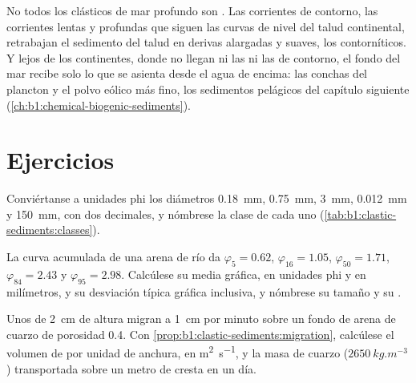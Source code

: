 No todos los clásticos de mar profundo son . Las corrientes de contorno, las corrientes lentas y profundas que siguen las curvas de nivel del talud continental, retrabajan
el sedimento del talud en derivas alargadas y suaves, los contorníticos. Y lejos de los continentes, donde no llegan ni las  ni las de contorno, el fondo del mar
recibe solo lo que se asienta desde el agua de encima: las conchas del plancton y el polvo eólico más fino, los sedimentos pelágicos del capítulo siguiente
(\cref{ch:b1:chemical-biogenic-sediments}).

\section{Ejercicios}

\begin{exercise}[$\star$]\label{exo:b1:clastic-sediments:1}
Conviértanse a unidades phi los diámetros \qty{0.18}{mm}, \qty{0.75}{mm}, \qty{3}{mm}, \qty{0.012}{mm} y \qty{150}{mm}, con dos decimales, y nómbrese la clase de cada uno
(\cref{tab:b1:clastic-sediments:classes}).
\end{exercise}

\begin{exercise}[$\star$]\label{exo:b1:clastic-sediments:2}
La curva acumulada de una arena de río da $\varphi_5 = 0.62$, $\varphi_{16} =
1.05$, $\varphi_{50} = 1.71$, $\varphi_{84} = 2.43$ y $\varphi_{95} = 2.98$.
Calcúlese su media gráfica, en unidades phi y en milímetros, y su desviación típica gráfica inclusiva, y nómbrese su tamaño y su .
\end{exercise}

\begin{exercise}[$\star$]\label{exo:b1:clastic-sediments:3}
Unos  de \qty{2}{cm} de altura migran a \qty{1}{cm} por minuto sobre un fondo de arena de cuarzo de porosidad \num{0.4}. Con \cref{prop:b1:clastic-sediments:migration},
calcúlese el volumen de  por unidad de anchura, en \si{m^2.s^{-1}}, y la masa de cuarzo ($\qty{2650}{kg.m^{-3}}$) transportada sobre un metro de cresta en un día.
\end{exercise}

